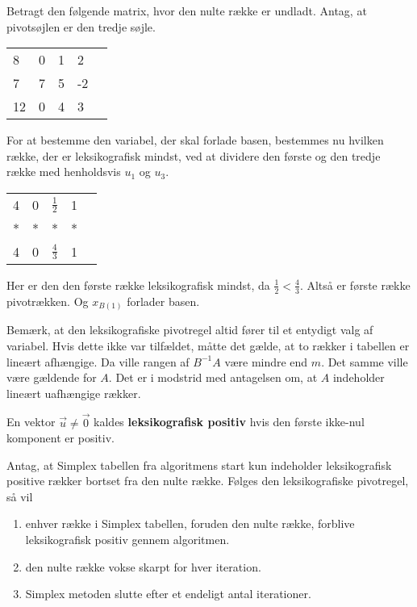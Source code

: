 \begin{eks}
Betragt den følgende matrix, hvor den nulte række er undladt. Antag, at pivotsøjlen er den tredje søjle. 

\begin{center}
\begin{tabular}{|l|llll|}
\hline
8  & 0 & 1 & 2  &  \\
7  & 7 & 5 & -2 &  \\
12 & 0 & 4 & 3  &  \\
\hline
\end{tabular}
\end{center}
For at bestemme den variabel, der skal forlade basen, bestemmes nu hvilken række, der er leksikografisk mindst, ved at dividere den første og den tredje række med henholdsvis $u_1$ og $u_3$.
\begin{center}
\begin{tabular}{|l|llll|}
\hline
4  & 0 & $\frac{1}{2}$ & 1  &  \\
*  & * & * & * &  \\
4 & 0 & $\frac{4}{3}$ & 1  &  \\
\hline
\end{tabular}
\end{center}
Her er den den første række leksikografisk mindst, da $\frac{1}{2}<\frac{4}{3}$.  Altså er første række pivotrækken. Og $x_{B(1)}$ forlader basen. 
\end{eks}

Bemærk, at den leksikografiske pivotregel altid fører til et entydigt valg af variabel. Hvis dette ikke var tilfældet, måtte det gælde, at to rækker i tabellen er lineært afhængige. Da ville rangen af $B^{-1}A$ være mindre end $m$. Det samme ville være gældende for $A$. Det er i modstrid med antagelsen om, at $A$ indeholder lineært uafhængige rækker. 

\begin{defn}
En vektor $\vec{u} \neq \vec{0}$ kaldes \textbf{leksikografisk positiv} hvis den første ikke-nul komponent er positiv. \citep{lexipositiv} 
\end{defn}

 
\begin{stn}
Antag, at Simplex tabellen fra algoritmens start kun indeholder leksikografisk positive rækker bortset fra den nulte række. Følges den leksikografiske pivotregel, så vil 
\begin{enumerate}[label=(\alph*)]
\item enhver række i Simplex tabellen, foruden den nulte række, forblive leksikografisk positiv gennem algoritmen. 
\item den nulte række vokse skarpt for hver iteration. 
\item Simplex metoden slutte efter et endeligt antal iterationer. 
\end{enumerate}
\label{stn:lexi}
\end{stn}

